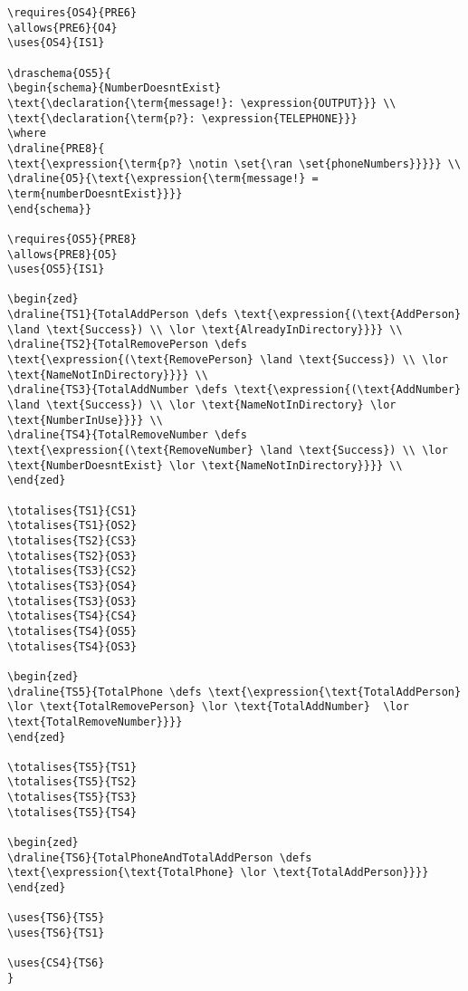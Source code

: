 \begin{verbatim}
\requires{OS4}{PRE6}
\allows{PRE6}{O4}
\uses{OS4}{IS1}

\draschema{OS5}{
\begin{schema}{NumberDoesntExist}
\text{\declaration{\term{message!}: \expression{OUTPUT}}} \\
\text{\declaration{\term{p?}: \expression{TELEPHONE}}}
\where
\draline{PRE8}{
\text{\expression{\term{p?} \notin \set{\ran \set{phoneNumbers}}}}} \\
\draline{O5}{\text{\expression{\term{message!} = \term{numberDoesntExist}}}}
\end{schema}}

\requires{OS5}{PRE8}
\allows{PRE8}{O5}
\uses{OS5}{IS1}

\begin{zed}
\draline{TS1}{TotalAddPerson \defs \text{\expression{(\text{AddPerson} \land \text{Success}) \\ \lor \text{AlreadyInDirectory}}}} \\
\draline{TS2}{TotalRemovePerson \defs \text{\expression{(\text{RemovePerson} \land \text{Success}) \\ \lor \text{NameNotInDirectory}}}} \\
\draline{TS3}{TotalAddNumber \defs \text{\expression{(\text{AddNumber} \land \text{Success}) \\ \lor \text{NameNotInDirectory} \lor \text{NumberInUse}}}} \\
\draline{TS4}{TotalRemoveNumber \defs \text{\expression{(\text{RemoveNumber} \land \text{Success}) \\ \lor \text{NumberDoesntExist} \lor \text{NameNotInDirectory}}}} \\
\end{zed}

\totalises{TS1}{CS1}
\totalises{TS1}{OS2}
\totalises{TS2}{CS3}
\totalises{TS2}{OS3}
\totalises{TS3}{CS2}
\totalises{TS3}{OS4}
\totalises{TS3}{OS3}
\totalises{TS4}{CS4}
\totalises{TS4}{OS5}
\totalises{TS4}{OS3}

\begin{zed}
\draline{TS5}{TotalPhone \defs \text{\expression{\text{TotalAddPerson} \lor \text{TotalRemovePerson} \lor \text{TotalAddNumber}  \lor \text{TotalRemoveNumber}}}}
\end{zed}

\totalises{TS5}{TS1}
\totalises{TS5}{TS2}
\totalises{TS5}{TS3}
\totalises{TS5}{TS4}

\begin{zed}
\draline{TS6}{TotalPhoneAndTotalAddPerson \defs \text{\expression{\text{TotalPhone} \lor \text{TotalAddPerson}}}}
\end{zed}

\uses{TS6}{TS5}
\uses{TS6}{TS1}

\uses{CS4}{TS6}
}


\end{verbatim}